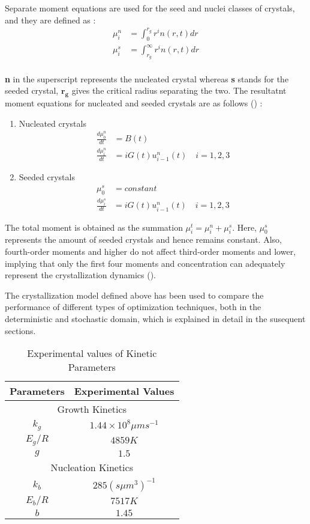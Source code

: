 \documentclass[3p,times,authoryear]{elsarticle}
\begin{document}
Separate moment equations are used for the seed and nuclei classes of crystals, and they are defined as : \\
\begin{align}
\mu^{n}_{i} &= \int_{0}^{r_{g}} r^{i}n(r,t) dr \\
\mu^{s}_{i} &= \int_{r_{g}}^{\infty} r^{i}n(r,t) dr
\end{align} \\
\textbf{n} in the superscript represents the nucleated crystal whereas \textbf{s} stands for the seeded crystal, $\boldsymbol{r_{g}}$ gives the critical radius separating the two. The resultatnt moment equations for nucleated and seeded crystals are as follows (\cite{yenkie}) :

\begin{enumerate}

\item Nucleated crystals
\begin{align}
\frac{d\mu_{0}^{n}}{dt} &= B(t) \label{g1}\\
\frac{d\mu_{i}^{n}}{dt} &= iG(t)u_{i-1}^{n}(t) \quad  i = 1,2,3
\end{align}

\item Seeded crystals
\begin{align}
\mu_{0}^{s} &= constant \\ \label{seed}
\frac{d\mu_{i}^{s}}{dt} &= iG(t)u_{i-1}^{n}(t) \quad  i = 1,2,3 \label{n1} 
\end{align}
\end{enumerate}
The total moment is obtained as the summation $\mu_{i}^{t} = \mu_{i}^{n} + \mu_{i}^{s}$. Here, $\mu_{0}^{s}$ represents the amount of seeded crystals and hence remains constant. Also, fourth-order moments and higher do not affect third-order moments and lower, implying that only the first four moments and concentration can adequately represent the crystallization dynamics (\cite{shi}). 
\par
The crystallization model defined above has been used to compare the performance of different types of optimization techniques, both in the deterministic and stochastic domain, which is explained in detail in the susequent sections.
\begin{center}
\begin{table}[!h]
\centering
\caption{Experimental values of Kinetic Parameters}
\begin{tabular}{|c|c|}
\hline
Parameters & Experimental Values \\
\hline
\multicolumn{2}{|c|}{Growth Kinetics} \\
\hline
$k_{g}$ & $1.44\times10^{8} \mu m s^{-1}$ \\
$E_{g}/R$ & $4859K$ \\
$g$ & $1.5$ \\
\hline
\multicolumn{2}{|c|}{Nucleation Kinetics} \\
\hline
$k_{b}$ & $285 (s \mu m^{3})^{-1}$ \\ 
$E_{b}/R$ & $7517K$ \\
$b$ & $1.45$ \\
\hline
\end{tabular}
\label{Table1}
\end{table}
\end{center}
\end{document}
